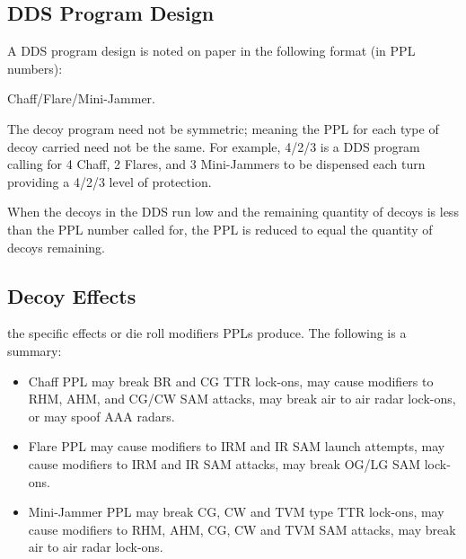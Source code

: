 \begin{advancedrules}
    \subsection{DDS Program Design} A DDS program design is noted on paper in the following format (in PPL numbers):
    \begin{center}
        Chaff/Flare/Mini-Jammer.
    \end{center}
    The decoy program need not be symmetric; meaning the PPL for each type of decoy carried need not be the same. For example, 4/2/3 is a DDS program calling for 4 Chaff, 2 Flares, and 3 Mini-Jammers to be dispensed each turn providing a 4/2/3 level of protection.

    When the decoys in the DDS run low and the remaining quantity of decoys is less than the PPL number called for, the PPL is reduced to equal the quantity of decoys remaining.


    \subsection{Decoy Effects}  the specific effects or die roll modifiers PPLs produce. The following is a summary:

    \begin{itemize}

        \item Chaff PPL may break BR and CG TTR lock-ons, may cause modifiers to RHM, AHM, and CG/CW SAM attacks, may break air to air radar lock-ons, or may spoof AAA radars.

        \item Flare PPL may cause modifiers to IRM and IR SAM launch attempts, may cause modifiers to IRM and IR SAM attacks, may break OG/LG SAM lock-ons.

        \item Mini-Jammer PPL may break CG, CW and TVM type TTR lock-ons, may cause modifiers to RHM, AHM, CG, CW and TVM SAM attacks, may break air to air radar lock-ons.

    \end{itemize}



\end{advancedrules}
